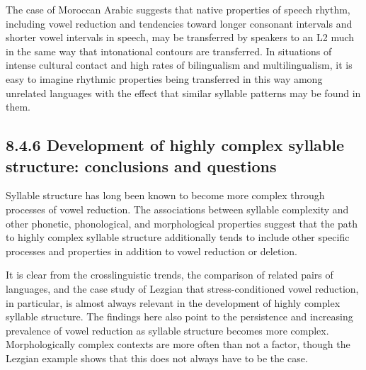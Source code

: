   The case of Moroccan Arabic suggests that native properties of speech rhythm, including vowel reduction and tendencies toward longer consonant intervals and shorter vowel intervals in speech, may be transferred by speakers to an L2 much in the same way that intonational contours are transferred. In situations of intense cultural contact and high rates of bilingualism and multilingualism, it is easy to imagine rhythmic properties being transferred in this way among unrelated languages with the effect that similar syllable patterns may be found in them.


\subsection{8.4.6 Development of highly complex syllable structure: conclusions and questions}

  Syllable structure has long been known to become more complex through processes of vowel reduction. The associations between syllable complexity and other phonetic, phonological, and morphological properties suggest that the path to highly complex syllable structure additionally tends to include other specific processes and properties in addition to vowel reduction or deletion.



  It is clear from the crosslinguistic trends, the comparison of related pairs of languages, and the case study of Lezgian that stress-conditioned vowel reduction, in particular, is almost always relevant in the development of highly complex syllable structure. The findings here also point to the persistence and increasing prevalence of vowel reduction as syllable structure becomes more complex. Morphologically complex contexts are more often than not a factor, though the Lezgian example shows that this does not always have to be the case.



